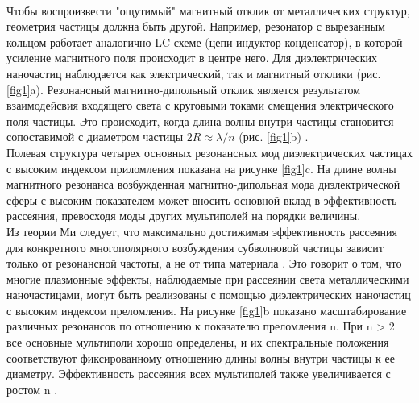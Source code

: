\\
\hspace*{2mm}
Чтобы воспроизвести "ощутимый" магнитный отклик от металлических структур, геометрия частицы должна быть другой. Например, резонатор с вырезанным кольцом \cite{pendry1999magnetism} работает аналогично LC-схеме (цепи индуктор-конденсатор), в которой усиление магнитного поля происходит в центре него. Для диэлектрических наночастиц наблюдается как электрический, так и магнитный отклики (рис. \ref{fig1}a). Резонансный магнитно-дипольный отклик является результатом взаимодейсвия входящего света с круговыми токами смещения электрического поля частицы. Это происходит, когда длина волны внутри частицы становится сопоставимой с диаметром частицы $2R \approx \lambda/n$ (рис. \ref{fig1}b) \cite{kuznetsov2016optically}. 
\\
\hspace*{2mm}
Полевая структура четырех основных резонансных мод диэлектрических частицах с высоким индексом приломления показана на рисунке \ref{fig1}c. На длине волны магнитного резонанса возбужденная магнитно-дипольная мода диэлектрической сферы с высоким показателем может вносить основной вклад в эффективность рассеяния, превосходя моды других мультиполей на порядки величины.
\\
\hspace*{2mm}
Из теории Ми следует, что максимально достижимая эффективность рассеяния для конкретного многополярного возбуждения субволновой частицы зависит только от резонансной частоты, а не от типа материала \cite{schuller2009general}. Это говорит о том, что многие плазмонные эффекты, наблюдаемые при рассеянии света металлическими наночастицами, могут быть реализованы с помощью диэлектрических наночастиц с высоким индексом преломления. На рисунке \ref{fig1}b показано масштабирование различных резонансов по отношению к показателю преломления n. При n > 2 все основные мультиполи хорошо определены, и их спектральные положения соответствуют фиксированному отношению длины волны внутри частицы к ее диаметру. Эффективность рассеяния всех мультиполей также увеличивается с ростом n \cite{articleOptSi}.

